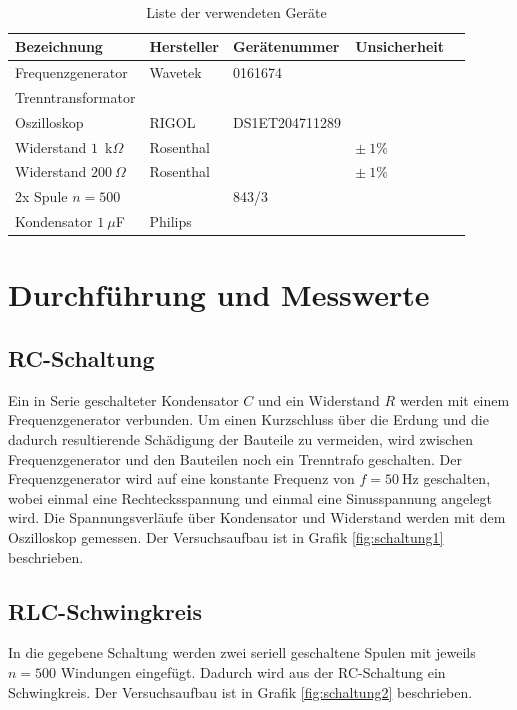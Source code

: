 \documentclass{article}
\begin{document}
\begin{table}[H]
\caption{Liste der verwendeten Geräte}

~

\begin{tabular}{l|llll}
Bezeichnung & Hersteller & Gerätenummer & Unsicherheit \\
\hline
Frequenzgenerator & Wavetek & 0161674  \\
Trenntransformator & \\
Oszilloskop & RIGOL &DS1ET204711289 \\
Widerstand $1$~k$\Omega$ & Rosenthal & & $\pm~1\%$ \\
Widerstand $200~\Omega$ & Rosenthal & & $\pm~1\%$ \\
2x Spule $n=500$ & & 843/3 \\
Kondensator $1~\mu$F & Philips
\end{tabular}

\end{table}




\section{Durchführung und Messwerte}

\subsection{RC-Schaltung}

Ein in Serie geschalteter Kondensator $C$ und ein Widerstand $R$ werden mit einem Frequenzgenerator verbunden. Um einen Kurzschluss über die Erdung und die dadurch resultierende Schädigung der Bauteile zu vermeiden, wird zwischen Frequenzgenerator und den Bauteilen noch ein Trenntrafo geschalten. Der Frequenzgenerator wird auf eine konstante Frequenz von $f=50~$Hz geschalten, wobei einmal eine Rechtecksspannung und einmal eine Sinusspannung angelegt wird. Die Spannungsverläufe über Kondensator und Widerstand werden mit dem Oszilloskop gemessen. Der Versuchsaufbau ist in Grafik \ref{fig:schaltung1} beschrieben.


\subsection{RLC-Schwingkreis}

In die gegebene Schaltung werden zwei seriell geschaltene Spulen mit jeweils $n=500$ Windungen eingefügt. Dadurch wird aus der RC-Schaltung ein Schwingkreis. Der Versuchsaufbau ist in Grafik \ref{fig:schaltung2} beschrieben.
\end{document}
